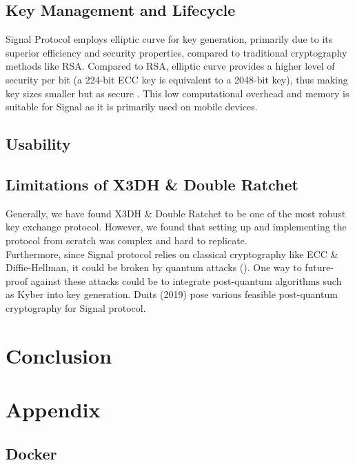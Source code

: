 \documentclass[11pt]{article}
\begin{document}
\subsection{Key Management and Lifecycle}
Signal Protocol employs elliptic curve for key generation, primarily due to its superior efficiency and security properties, compared to traditional cryptography methods like RSA. Compared to RSA, elliptic curve provides a higher level of security per bit (a 224-bit ECC key is equivalent to a 2048-bit key), thus making key sizes smaller but as secure \cite{mahto2017rsa}. This low computational overhead and memory is suitable for Signal as it is primarily used on mobile devices.

\subsection{Usability}


\subsection{Limitations of X3DH \& Double Ratchet}
%
Generally, we have found X3DH \& Double Ratchet to be one of the most robust key exchange protocol. However, we found that setting up and implementing the protocol from scratch was complex and hard to replicate.
\\
Furthermore, since Signal protocol relies on classical cryptography like ECC \& Diffie-Hellman, it could be broken by quantum attacks (). One way to future-proof against these attacks could be to integrate post-quantum algorithms such as Kyber into key generation. Duits (2019) pose various feasible post-quantum cryptography for Signal protocol.
\section{Conclusion}

\section{Appendix}

\subsection{Docker}



\end{document}
